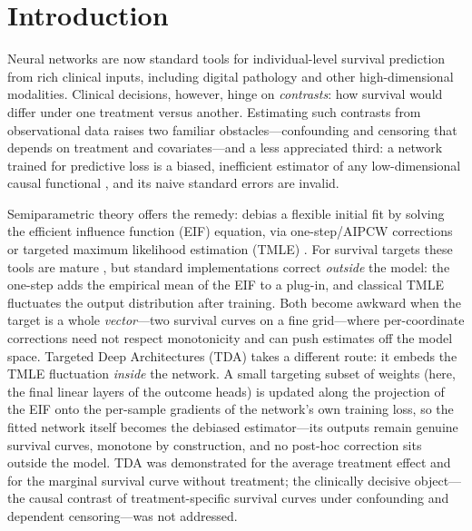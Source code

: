 \documentclass[11pt]{article}
\theoremstyle{remark}
\begin{document}
\section{Introduction}\label{sec:intro}

Neural networks are now standard tools for individual-level survival prediction from rich clinical inputs, including digital pathology and other high-dimensional modalities. Clinical decisions, however, hinge on \emph{contrasts}: how survival would differ under one treatment versus another. Estimating such contrasts from observational data raises two familiar obstacles---confounding and censoring that depends on treatment and covariates---and a less appreciated third: a network trained for predictive loss is a biased, inefficient estimator of any low-dimensional causal functional \citep{chernozhukov2018dml,shi2019dragonnet}, and its naive standard errors are invalid.

Semiparametric theory offers the remedy: debias a flexible initial fit by solving the efficient influence function (EIF) equation, via one-step/AIPCW corrections \citep{chernozhukov2018dml,kennedy2024review} or targeted maximum likelihood estimation (TMLE) \citep{vdl2011tl}. For survival targets these tools are mature \citep{moore2009,cai2020,rytgaard2024}, but standard implementations correct \emph{outside} the model: the one-step adds the empirical mean of the EIF to a plug-in, and classical TMLE fluctuates the output distribution after training. Both become awkward when the target is a whole \emph{vector}---two survival curves on a fine grid---where per-coordinate corrections need not respect monotonicity and can push estimates off the model space. Targeted Deep Architectures (TDA) \citep{li2025tda} takes a different route: it embeds the TMLE fluctuation \emph{inside} the network. A small targeting subset of weights (here, the final linear layers of the outcome heads) is updated along the projection of the EIF onto the per-sample gradients of the network's own training loss, so the fitted network itself becomes the debiased estimator---its outputs remain genuine survival curves, monotone by construction, and no post-hoc correction sits outside the model. TDA was demonstrated for the average treatment effect and for the marginal survival curve without treatment; the clinically decisive object---the causal contrast of treatment-specific survival curves under confounding and dependent censoring---was not addressed.
\end{document}

